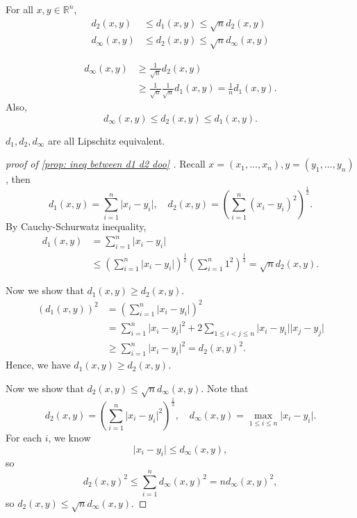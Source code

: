\begin{proposition} \label{prop: ineq between d1 d2 doo}
    For all \(x, y \in \mathbb{R} ^n\), 
    \begin{align}
        d_2(x, y) &\le d_1(x, y) \le \sqrt{n} d_2(x,y) \\
        d_\infty (x, y) &\le d_2(x, y) \le \sqrt{n} d_\infty (x, y) 
    \end{align}
\end{proposition}
\begin{remark}
    \begin{align*}
        d_\infty (x, y) &\ge \frac{1}{\sqrt{n}} d_2(x, y) \\
        &\ge \frac{1}{\sqrt{n}} \frac{1}{\sqrt{n}} d_1(x, y) = \frac{1}{n}d_1(x, y).
    \end{align*}
    Also, 
    \[
        d_\infty (x, y) \le d_2(x, y) \le d_1(x, y).
    \]
\end{remark}
\begin{remark}
    \(d_1, d_2, d_\infty \) are all Lipschitz equivalent. 
\end{remark}
\begin{proof}[proof of \autoref{prop: ineq between d1 d2 doo} ]
    Recall \(x = (x_1, \dots , x_n), y = (y_1, \dots , y_n)\), then 
    \[
        d_1(x, y) = \sum_{i=1}^n \vert x_i - y_i \vert, \quad d_2(x,y) = \left( \sum_{i=1}^n (x_i - y_i)^2  \right)^\frac{1}{2}.   
    \] 
    By Cauchy-Schurwatz inequality, 
    \begin{align*}
        d_1(x, y) &= \sum_{i=1}^n \vert x_i - y_i \vert \\
        &\le \left( \sum_{i=1}^n \vert x_i - y_i \vert   \right)^\frac{1}{2} \left( \sum_{i=1}^n 1^2  \right)^\frac{1}{2} = \sqrt{n} d_2(x,y).     
    \end{align*}

    Now we show that \(d_1(x, y) \ge d_2(x, y)\). 
    \begin{align*}
        \left( d_1(x, y) \right)^2 &= \left( \sum_{i=1}^n \vert x_i - y_i \vert   \right)^2 \\
        &= \sum_{i=1}^n \vert x_i - y_i \vert^2 + 2 \sum_{1 \le i < j \le n} \vert x_i - y_i \vert \vert x_j - y_j \vert \\
        & \ge \sum_{i=1}^n \vert x_i - y_i \vert^2 = d_2(x, y)^2.         
    \end{align*} 
    Hence, we have \(d_1(x, y) \ge d_2(x, y)\).
    
    Now we show that \(d_2(x, y) \le \sqrt{n} d_\infty (x, y) \). Note that 
    \[
        d_2(x, y) = \left( \sum_{i=1}^n \vert x_i - y_i \vert^2  \right)^\frac{1}{2}, \quad d_\infty (x, y) = \max_{1 \le i \le n} \vert x_i - y_i \vert.   
    \] For each \(i\), we know 
    \[
        \vert x_i - y_i \vert \le d_\infty (x, y), 
    \] so 
    \[
        d_2(x, y) ^2 \le \sum_{i=1}^n d_\infty (x, y)^2 = n d_\infty (x, y)^2, 
    \] so \(d_2(x, y) \le \sqrt{n} d_\infty (x, y) \). 
\end{proof}

